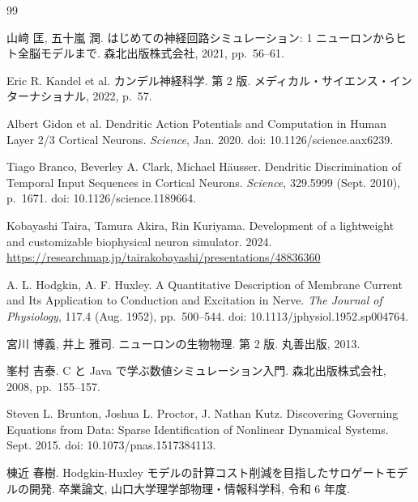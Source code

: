 \documentclass[a4paper,11pt,openany]{ltjsreport}
\newcommand{\TODO}[1]{\textcolor{red}{\textbf{[TODO: #1]}}}
\begin{document}
\begin{thebibliography}{99}

山﨑 匡, 五十嵐 潤.
\newblock はじめての神経回路シミュレーション: 1 ニューロンからヒト全脳モデルまで.
\newblock 森北出版株式会社, 2021, pp.~56--61.

Eric R. Kandel et al.
\newblock カンデル神経科学. 第 2 版.
\newblock メディカル・サイエンス・インターナショナル, 2022, p.~57.

Albert Gidon et al.
\newblock Dendritic Action Potentials and Computation in Human Layer 2/3 Cortical Neurons.
\newblock \textit{Science}, Jan. 2020.
\newblock doi: 10.1126/science.aax6239.

Tiago Branco, Beverley A. Clark, Michael H\"ausser.
\newblock Dendritic Discrimination of Temporal Input Sequences in Cortical Neurons.
\newblock \textit{Science}, 329.5999 (Sept. 2010), p.~1671.
\newblock doi: 10.1126/science.1189664.

Kobayashi Taira, Tamura Akira, Rin Kuriyama.
\newblock Development of a lightweight and customizable biophysical neuron simulator. 2024.
\newblock \url{https://researchmap.jp/tairakobayashi/presentations/48836360}

A. L. Hodgkin, A. F. Huxley.
\newblock A Quantitative Description of Membrane Current and Its Application to
Conduction and Excitation in Nerve.
\newblock \textit{The Journal of Physiology}, 117.4 (Aug. 1952), pp.~500--544.
\newblock doi: 10.1113/jphysiol.1952.sp004764.

宮川 博義, 井上 雅司.
\newblock ニューロンの生物物理. 第 2 版.
\newblock 丸善出版, 2013.

峯村 吉泰.
\newblock C と Java で学ぶ数値シミュレーション入門.
\newblock 森北出版株式会社, 2008, pp.~155--157.

Steven L. Brunton, Joshua L. Proctor, J. Nathan Kutz.
\newblock Discovering Governing Equations from Data: Sparse Identification of
Nonlinear Dynamical Systems. Sept. 2015.
\newblock doi: 10.1073/pnas.1517384113.

棟近 春樹.
\newblock Hodgkin-Huxley モデルの計算コスト削減を目指したサロゲートモデルの開発.
\newblock 卒業論文, 山口大学理学部物理・情報科学科, 令和 6 年度.


\end{thebibliography}
\end{document}
